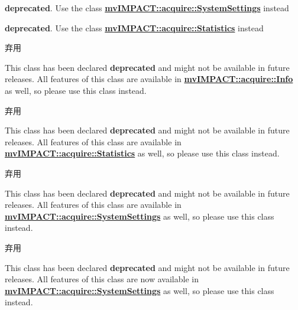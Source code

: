 {\bfseries deprecated}. Use the class {\bfseries \hyperlink{classmv_i_m_p_a_c_t_1_1acquire_1_1_system_settings}{mv\+I\+M\+P\+A\+C\+T\+::acquire\+::\+System\+Settings}} instead

{\bfseries deprecated}. Use the class {\bfseries \hyperlink{classmv_i_m_p_a_c_t_1_1acquire_1_1_statistics}{mv\+I\+M\+P\+A\+C\+T\+::acquire\+::\+Statistics}} instead

\begin{DoxyRefDesc}{弃用}
\item[\hyperlink{deprecated__deprecated000008}{弃用}]This class has been declared {\bfseries deprecated} and might not be available in future releases. All features of this class are available in {\bfseries \hyperlink{classmv_i_m_p_a_c_t_1_1acquire_1_1_info}{mv\+I\+M\+P\+A\+C\+T\+::acquire\+::\+Info}} as well, so please use this class instead. \end{DoxyRefDesc}


\begin{DoxyRefDesc}{弃用}
\item[\hyperlink{deprecated__deprecated000009}{弃用}]This class has been declared {\bfseries deprecated} and might not be available in future releases. All features of this class are available in {\bfseries \hyperlink{classmv_i_m_p_a_c_t_1_1acquire_1_1_statistics}{mv\+I\+M\+P\+A\+C\+T\+::acquire\+::\+Statistics}} as well, so please use this class instead. \end{DoxyRefDesc}


\begin{DoxyRefDesc}{弃用}
\item[\hyperlink{deprecated__deprecated000010}{弃用}]This class has been declared {\bfseries deprecated} and might not be available in future releases. All features of this class are available in {\bfseries \hyperlink{classmv_i_m_p_a_c_t_1_1acquire_1_1_system_settings}{mv\+I\+M\+P\+A\+C\+T\+::acquire\+::\+System\+Settings}} as well, so please use this class instead. \end{DoxyRefDesc}


\begin{DoxyRefDesc}{弃用}
\item[\hyperlink{deprecated__deprecated000014}{弃用}]This class has been declared {\bfseries deprecated} and might not be available in future releases. All features of this class are now available in {\bfseries \hyperlink{classmv_i_m_p_a_c_t_1_1acquire_1_1_system_settings}{mv\+I\+M\+P\+A\+C\+T\+::acquire\+::\+System\+Settings}} as well, so please use this class instead.\end{DoxyRefDesc}


